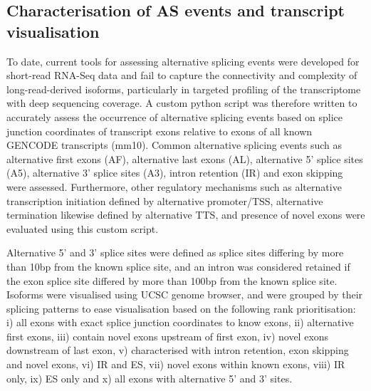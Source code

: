 \subsection{Characterisation of AS events and transcript visualisation}
To date, current tools for assessing alternative splicing events were developed for short-read RNA-Seq data and fail to capture the connectivity and complexity of long-read-derived isoforms, particularly in targeted profiling of the transcriptome with deep sequencing coverage. A custom python script was therefore written to accurately assess the occurrence of alternative splicing events based on splice junction coordinates of transcript exons relative to exons of all known GENCODE transcripts (mm10). Common alternative splicing events such as alternative first exons (AF), alternative last exons (AL), alternative 5' splice sites (A5), alternative 3' splice sites (A3), intron retention (IR) and exon skipping were assessed. Furthermore, other regulatory mechanisms such as alternative transcription initiation defined by alternative promoter/TSS, alternative termination likewise defined by alternative TTS, and presence of novel exons were evaluated using this custom script.


Alternative 5' and 3' splice sites were defined as splice sites differing by more than 10bp from the known splice site, and an intron was considered retained if the exon splice site differed by more than 100bp from the known splice site. Isoforms were visualised using UCSC genome browser, and were grouped by their splicing patterns to ease visualisation based on the following rank prioritisation: i) all exons with exact splice junction coordinates to know exons, ii) alternative first exons, iii) contain novel exons upstream of first exon, iv) novel exons downstream of last exon, v) characterised with intron retention, exon skipping and novel exons, vi) IR and ES, vii) novel exons within known exons, viii) IR only, ix) ES only and x) all exons with alternative 5' and 3' sites.


